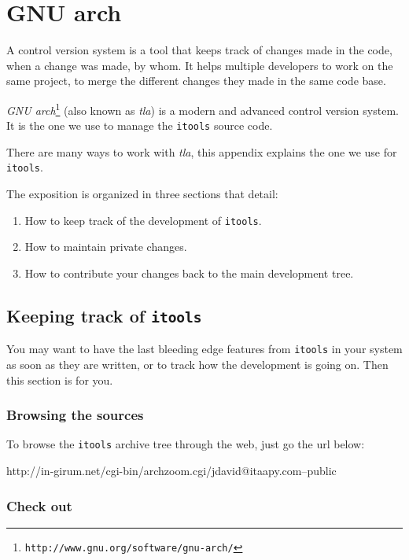\chapter{GNU arch}

A control version system is a tool that keeps track of changes made
in the code, when a change was made, by whom. It helps multiple
developers to work on the same project, to merge the different
changes they made in the same code base.

{\em GNU arch}\footnote{\tt http://www.gnu.org/software/gnu-arch/}
(also known as {\em tla}) is a modern and advanced control version
system. It is the one we use to manage the {\tt itools} source code.

There are many ways to work with {\em tla}, this appendix explains
the one we use for {\tt itools}.

The exposition is organized in three sections that detail:

\begin{enumerate}
  \item How to keep track of the development of {\tt itools}.

  \item How to maintain private changes.

  \item How to contribute your changes back to the main development tree.
\end{enumerate}


\section{Keeping track of {\tt itools}}

You may want to have the last bleeding edge features from {\tt itools} in
your system as soon as they are written, or to track how the development
is going on. Then this section is for you.

\subsection{Browsing the sources}

To browse the {\tt itools} archive tree through the web, just go the url
below:

\begin{code}
    http://in-girum.net/cgi-bin/archzoom.cgi/jdavid@itaapy.com--public
\end{code}

\subsection{Check out}


